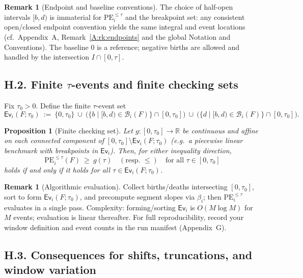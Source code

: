 \documentclass[11pt]{article}
\numberwithin{equation}{section}
\newtheorem{proposition}[theorem]{Proposition}
\theoremstyle{definition}
\newtheorem{remark}[theorem]{Remark}
\begin{document}
\begin{remark}[Endpoint and baseline conventions]\label{H:rk:endpoints}
The choice of half-open intervals \([b,d)\) is immaterial for \(\mathrm{PE}_i^{\le \tau}\) and the breakpoint set: any consistent open/closed endpoint convention yields the same integral and event locations (cf.\ Appendix~A, Remark~\ref{A:rk:endpoints} and the global Notation and Conventions).
The baseline \(0\) is a reference; negative births are allowed and handled by the intersection \(I\cap[0,\tau]\).
\end{remark}

\subsection*{H.2. Finite \texorpdfstring{$\tau$}{tau}-events and finite checking sets}
Fix \(\tau_0>0\). Define the finite \(\tau\)-event set
\[
\mathsf{Ev}_i(F;\tau_0)\ :=\ \{0,\tau_0\}\ \cup\ \bigl(\{b\mid [b,d)\in\mathcal{B}_i(F)\}\cap[0,\tau_0]\bigr)\ \cup\ \bigl(\{d\mid [b,d)\in\mathcal{B}_i(F)\}\cap[0,\tau_0]\bigr).
\]

\begin{proposition}[Finite checking set]\label{H:prop:finite-check}
Let \(g:[0,\tau_0]\to\mathbb{R}\) be continuous and affine on each connected component of \([0,\tau_0]\setminus \mathsf{Ev}_i(F;\tau_0)\) (e.g.\ a piecewise linear benchmark with breakpoints in \(\mathsf{Ev}_i\)). Then, for either inequality direction,
\[
\mathrm{PE}_i^{\le \tau}(F)\ \ge\ g(\tau)\quad(\text{resp.\ }\le)\quad\text{for all }\tau\in[0,\tau_0]
\]
holds if and only if it holds for all \(\tau\in \mathsf{Ev}_i(F;\tau_0)\).
\end{proposition}

\begin{remark}[Algorithmic evaluation]\label{H:rk:algo}
Collect births/deaths intersecting \([0,\tau_0]\), sort to form \(\mathsf{Ev}_i(F;\tau_0)\), and precompute segment slopes via \(\beta_i\); then \(\mathrm{PE}_i^{\le \tau}\) evaluates in a single pass. Complexity: forming/sorting \(\mathsf{Ev}_i\) is \(O(M\log M)\) for \(M\) events; evaluation is linear thereafter. For full reproducibility, record your window definition and event counts in the run manifest (Appendix~G).
\end{remark}

\subsection*{H.3. Consequences for shifts, truncations, and window variation}
\end{document}
